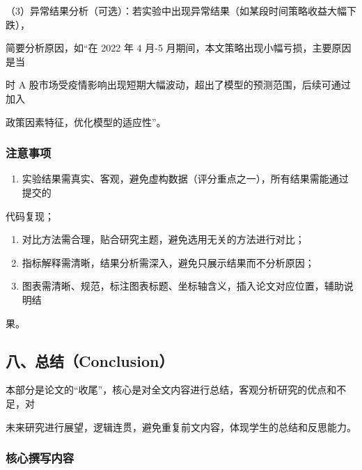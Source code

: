 \documentclass[
]{article}
\providecommand{\tightlist}{%
  \setlength{\itemsep}{0pt}\setlength{\parskip}{0pt}}
\begin{document}
（3）异常结果分析（可选）：若实验中出现异常结果（如某段时间策略收益大幅下跌），

简要分析原因，如``在 2022 年 4 月-5
月期间，本文策略出现小幅亏损，主要原因是当

时 A
股市场受疫情影响出现短期大幅波动，超出了模型的预测范围，后续可通过加入

政策因素特征，优化模型的适应性''。

\hypertarget{ux6ce8ux610fux4e8bux9879-4}{%
\subsubsection{\texorpdfstring{\textbf{注意事项}}{注意事项}}\label{ux6ce8ux610fux4e8bux9879-4}}

\begin{enumerate}
\def\labelenumi{\arabic{enumi}.}
\tightlist
\item
  实验结果需真实、客观，避免虚构数据（评分重点之一），所有结果需能通过提交的
\end{enumerate}

代码复现；

\begin{enumerate}
\def\labelenumi{\arabic{enumi}.}
\setcounter{enumi}{1}
\item
  对比方法需合理，贴合研究主题，避免选用无关的方法进行对比；
\item
  指标解释需清晰，结果分析需深入，避免只展示结果而不分析原因；
\item
  图表需清晰、规范，标注图表标题、坐标轴含义，插入论文对应位置，辅助说明结
\end{enumerate}

果。

\hypertarget{ux516bux603bux7ed3conclusion}{%
\subsection{\texorpdfstring{\textbf{八、总结（Conclusion）}}{八、总结（Conclusion）}}\label{ux516bux603bux7ed3conclusion}}

本部分是论文的``收尾''，核心是对全文内容进行总结，客观分析研究的优点和不足，对

未来研究进行展望，逻辑连贯，避免重复前文内容，体现学生的总结和反思能力。

\hypertarget{ux6838ux5fc3ux64b0ux5199ux5185ux5bb9-2}{%
\subsubsection{\texorpdfstring{\textbf{核心撰写内容}}{核心撰写内容}}\label{ux6838ux5fc3ux64b0ux5199ux5185ux5bb9-2}}
\end{document}
